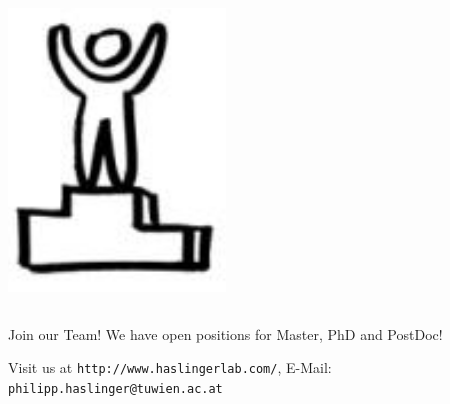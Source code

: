 \documentclass[final]{beamer}
\begin{document}
\begin{frame}[fragile]{}
\begin{columns}[T]
\begin{column}{.49\linewidth}
\begin{block}{}
\begin{columns}
\begin{column}{0.07\columnwidth}
            \includegraphics[width=\columnwidth]{figures/logo-start.png}
          \end{column}
        \end{columns}
      \end{block}


      \begin{block}{\Large Join our Team!}
        {\Large We have open positions for Master, PhD and PostDoc!}

        Visit us at \texttt{http://www.haslingerlab.com/}, E-Mail: \texttt{philipp.haslinger@tuwien.ac.at}
      \end{block}
    \end{column}

  \end{columns}

\end{frame}
\end{document}
